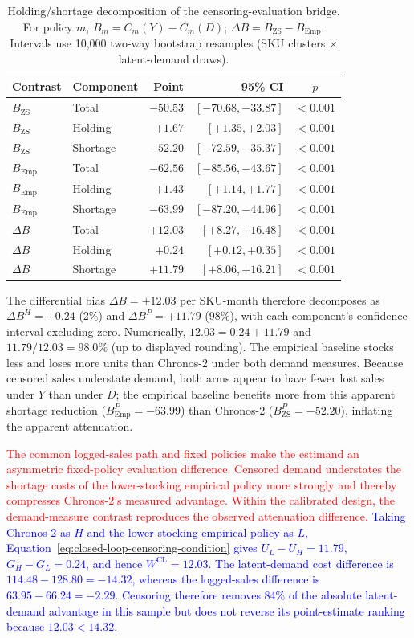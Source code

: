 \documentclass[msom,dblanonrev]{informs4}
\newcommand{\add}[1]{\textcolor{blue}{#1}}
\newcommand{\reduce}[1]{\textcolor{red}{#1}\hspace{0.5em}}
\begin{document}
\begin{table}[ht]
\caption{Holding/shortage decomposition of the censoring-evaluation bridge. For policy $m$, $B_m=C_m(Y)-C_m(D)$; $\Delta B=B_{\mathrm{ZS}}-B_{\mathrm{Emp}}$. Intervals use 10{,}000 two-way bootstrap resamples (SKU clusters $\times$ latent-demand draws).}\label{tab:hp-bridge}
\centering\small
\begin{tabular}{llrrc}
\toprule
\textbf{Contrast} & \textbf{Component} & \textbf{Point} & \textbf{95\% CI} & \textbf{$p$} \\
\midrule
$B_{\mathrm{ZS}}$ & Total    & $-50.53$ & $[-70.68,-33.87]$ & $<0.001$ \\
$B_{\mathrm{ZS}}$ & Holding  & $+1.67$  & $[+1.35,+2.03]$   & $<0.001$ \\
$B_{\mathrm{ZS}}$ & Shortage & $-52.20$ & $[-72.59,-35.37]$ & $<0.001$ \\
$B_{\mathrm{Emp}}$ & Total    & $-62.56$ & $[-85.56,-43.67]$ & $<0.001$ \\
$B_{\mathrm{Emp}}$ & Holding  & $+1.43$  & $[+1.14,+1.77]$   & $<0.001$ \\
$B_{\mathrm{Emp}}$ & Shortage & $-63.99$ & $[-87.20,-44.96]$ & $<0.001$ \\
\midrule
$\Delta B$ & Total    & $+12.03$ & $[+8.27,+16.48]$ & $<0.001$ \\
$\Delta B$ & Holding  & $+0.24$  & $[+0.12,+0.35]$  & $<0.001$ \\
$\Delta B$ & Shortage & $+11.79$ & $[+8.06,+16.21]$ & $<0.001$ \\
\bottomrule
\end{tabular}
\end{table}

The differential bias $\Delta B=+12.03$ per SKU-month therefore decomposes as $\Delta B^H=+0.24$ (2\%) and $\Delta B^P=+11.79$ (98\%), with each component's confidence interval excluding zero.
Numerically, $12.03=0.24+11.79$ and $11.79/12.03=98.0\%$ (up to displayed rounding).
The empirical baseline stocks less and loses more units than Chronos-2 under both demand measures.
Because censored sales understate demand, both arms appear to have fewer lost sales under $Y$ than under $D$; the empirical baseline benefits more from this apparent shortage reduction ($B^P_\text{Emp} = -63.99$) than Chronos-2 ($B^P_\text{ZS} = -52.20$), inflating the apparent attenuation.

\reduce{The common logged-sales path and fixed policies make the estimand an asymmetric fixed-policy evaluation difference.
Censored demand understates the shortage costs of the lower-stocking empirical policy more strongly and thereby compresses Chronos-2's measured advantage.
Within the calibrated design, the demand-measure contrast reproduces the observed attenuation difference.}
\add{Taking Chronos-2 as $H$ and the lower-stocking empirical policy as $L$, Equation~\eqref{eq:closed-loop-censoring-condition} gives $U_L-U_H=11.79$, $G_H-G_L=0.24$, and hence $W^{\mathrm{CL}}=12.03$. The latent-demand cost difference is $114.48-128.80=-14.32$, whereas the logged-sales difference is $63.95-66.24=-2.29$. Censoring therefore removes 84\% of the absolute latent-demand advantage in this sample but does not reverse its point-estimate ranking because $12.03<14.32$.}
\end{document}
